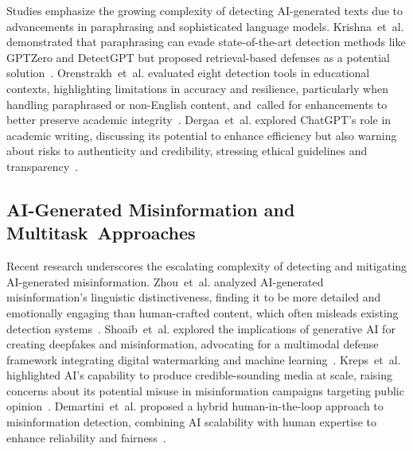 \documentclass[electronics,article,accept,pdftex,moreauthors,electronics]{Definitions/mdpi}
\begin{document}
Studies emphasize the growing complexity of detecting AI-generated texts due to advancements in paraphrasing and sophisticated language models. Krishna~et~al. demonstrated that paraphrasing can evade state-of-the-art detection methods like GPTZero and DetectGPT but proposed retrieval-based defenses as a potential solution~\cite{krishna_paraphrasing_nodate}. Orenstrakh~et~al. evaluated eight detection tools in educational contexts, highlighting limitations in accuracy and resilience, particularly when handling paraphrased or non-English content, and~called for enhancements to better preserve academic integrity~\cite{orenstrakh_detecting_2024}. Dergaa~et~al. explored ChatGPT’s role in academic writing, discussing its potential to enhance efficiency but also warning about risks to authenticity and credibility, stressing ethical guidelines and transparency~\cite{dergaa_human_2023}.

\subsection{AI-Generated Misinformation and Multitask~Approaches}

Recent research underscores the escalating complexity of detecting and mitigating AI-generated misinformation. Zhou~et~al. analyzed AI-generated misinformation's linguistic distinctiveness, finding it to be more detailed and emotionally engaging than human-crafted content, which often misleads existing detection systems~\cite{zhou_synthetic_2023}. Shoaib~et~al. explored the implications of generative AI for creating deepfakes and misinformation, advocating for a multimodal defense framework integrating digital watermarking and machine learning~\cite{shoaib_deepfakes_2023}. Kreps~et~al. highlighted AI's capability to produce credible-sounding media at scale, raising concerns about its potential misuse in misinformation campaigns targeting public opinion~\cite{kreps_all_2022}. Demartini~et~al. proposed a hybrid human-in-the-loop approach to misinformation detection, combining AI scalability with human expertise to enhance reliability and fairness~\cite{demartini_human---loop_nodate}.
\end{document}

